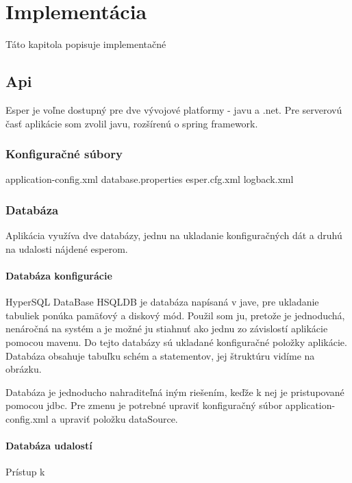 \chapter{Implementácia}
Táto kapitola popisuje implementačné 

\section{Api}
	Esper je voľne dostupný pre dve vývojové platformy - javu a .net. Pre serverovú časť aplikácie som zvolil javu, rozšírenú o spring framework.
	\subsection{Konfiguračné súbory}
		application-config.xml
		database.properties
		esper.cfg.xml
		logback.xml
	\subsection{Databáza}
		Aplikácia využíva dve databázy, jednu na ukladanie konfiguračných dát a druhú na udalosti nájdené esperom.
	
		\subsubsection{Databáza konfigurácie}
		HyperSQL DataBase
		HSQLDB je databáza napísaná v jave, pre ukladanie tabuliek ponúka pamäťový a diskový mód. Použil som ju, pretože je jednoduchá, nenáročná na systém a je možné ju stiahnuť ako jednu zo závislostí aplikácie pomocou mavenu.
		Do tejto databázy sú ukladané konfiguračné položky aplikácie. Databáza obsahuje tabuľku schém a statementov, jej štruktúru vidíme na obrázku.
			
		Databáza je jednoducho nahraditeľná iným riešením, keďže k nej je pristupované pomocou jdbc. Pre zmenu je potrebné upraviť konfiguračný súbor application-config.xml a upraviť položku dataSource.
		
		\subsubsection{Databáza udalostí}
		Prístup k 
	

